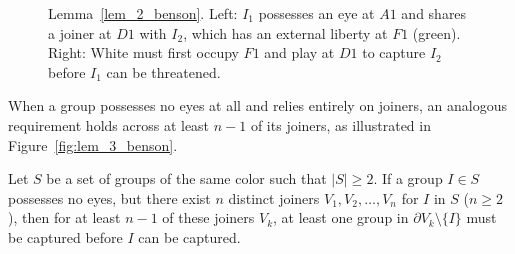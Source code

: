 \begin{figure}[H]
	\centering
	\begin{goban}[7, hoshi = false]
	\end{goban}
	\quad
	\begin{goban}[7, hoshi = false]
	\end{goban}
	\caption{Lemma~\ref{lem_2_benson}. Left: $I_1$ possesses an \textcolor{sealred}{eye} at $A1$ and shares a \textcolor{bg}{joiner} at $D1$ with $I_2$, which has an external liberty at $F1$ (\textcolor{Moss}{green}). Right: White must first occupy $F1$ and play at $D1$ to capture $I_2$ before $I_1$ can be threatened.}
	\label{fig:lem_2_benson}
\end{figure}

When a group possesses no eyes at all and relies entirely on joiners, an analogous requirement holds across at least $n-1$ of its joiners, as illustrated in Figure~\ref{fig:lem_3_benson}.

\begin{lemma}\label{lem_3_benson}
	Let $S$ be a set of groups of the same color such that $|S| \ge 2$. If a group $I \in S$ possesses no eyes, but there exist $n$ distinct joiners $V_1, V_2, \dots, V_n$ for $I$ in $S$ ($n \ge 2$), then for at least $n-1$ of these joiners $V_k$, at least one group in $\partial V_k \setminus \{I\}$ must be captured before $I$ can be captured.
\end{lemma}

